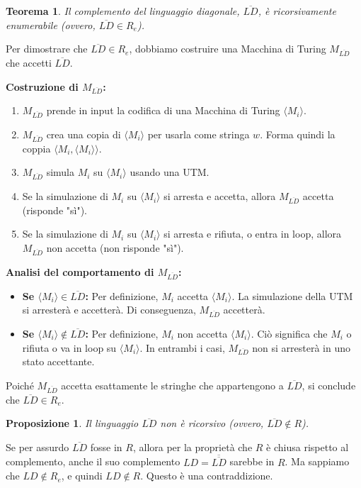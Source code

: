 \documentclass[a4paper]{article}
\makeatletter
\newtheorem{theorem}{Teorema}[section] %
\newtheorem{proposition}{Proposizione}[section]
\renewenvironment{proof}[1][\proofname]{\par
  \pushQED{\qed}%
  \normalfont \topsep6\p@\@plus6\p@\relax
  \trivlist
  \item[\hskip\labelsep
        \bfseries
    #1\@addpunct{.}]\ignorespaces
}{%
  \popQED\endtrivlist\@endpefalse
}
\makeatother
\begin{document}
\begin{theorem}
Il complemento del linguaggio diagonale, $\overline{LD}$, è ricorsivamente enumerabile (ovvero, $\overline{LD} \in R_e$).
\end{theorem}
\begin{proof}
Per dimostrare che $\overline{LD} \in R_e$, dobbiamo costruire una Macchina di Turing $M_{\overline{LD}}$ che accetti $\overline{LD}$.

\textbf{Costruzione di $M_{\overline{LD}}$:}
\begin{enumerate}
    \item $M_{\overline{LD}}$ prende in input la codifica di una Macchina di Turing $\langle M_i \rangle$.
    \item $M_{\overline{LD}}$ crea una copia di $\langle M_i \rangle$ per usarla come stringa $w$. Forma quindi la coppia $\langle M_i, \langle M_i \rangle \rangle$.
    \item $M_{\overline{LD}}$ simula $M_i$ su $\langle M_i \rangle$ usando una UTM.
    \item Se la simulazione di $M_i$ su $\langle M_i \rangle$ si arresta e accetta, allora $M_{\overline{LD}}$ accetta (risponde "sì").
    \item Se la simulazione di $M_i$ su $\langle M_i \rangle$ si arresta e rifiuta, o entra in loop, allora $M_{\overline{LD}}$ non accetta (non risponde "sì").
\end{enumerate}
\textbf{Analisi del comportamento di $M_{\overline{LD}}$:}
\begin{itemize}
    \item \textbf{Se $\langle M_i \rangle \in \overline{LD}$:}
    Per definizione, $M_i$ accetta $\langle M_i \rangle$. La simulazione della UTM si arresterà e accetterà. Di conseguenza, $M_{\overline{LD}}$ accetterà.
    \item \textbf{Se $\langle M_i \rangle \notin \overline{LD}$:}
    Per definizione, $M_i$ non accetta $\langle M_i \rangle$. Ciò significa che $M_i$ o rifiuta o va in loop su $\langle M_i \rangle$. In entrambi i casi, $M_{\overline{LD}}$ non si arresterà in uno stato accettante.
\end{itemize}
Poiché $M_{\overline{LD}}$ accetta esattamente le stringhe che appartengono a $\overline{LD}$, si conclude che $\overline{LD} \in R_e$.
\end{proof}

\begin{proposition}
Il linguaggio $\overline{LD}$ non è ricorsivo (ovvero, $\overline{LD} \notin R$).
\end{proposition}
\begin{proof}
Se per assurdo $\overline{LD}$ fosse in $R$, allora per la proprietà che $R$ è chiusa rispetto al complemento, anche il suo complemento $LD = \overline{\overline{LD}}$ sarebbe in $R$. Ma sappiamo che $LD \notin R_e$, e quindi $LD \notin R$. Questo è una contraddizione.
\end{proof}
\end{document}
